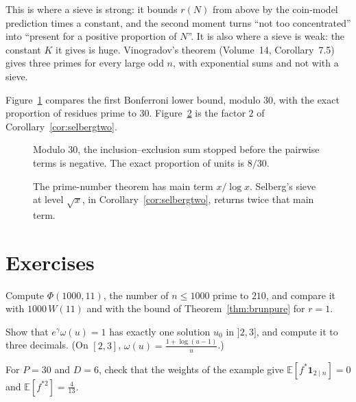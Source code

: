 This is where a sieve is strong: it bounds $r(N)$ from above by the coin-model prediction times a constant, and the second moment turns ``not too concentrated'' into ``present for a positive proportion of $N$''. It is also where a sieve is weak: the constant $K$ it gives is huge. Vinogradov's theorem (Volume~14, Corollary~7.5) gives three primes for every large odd $n$, with exponential sums and not with a sieve.


Figure~\ref{fig:v15c06-bonferroni} compares the first Bonferroni lower bound, modulo \(30\), with the exact proportion of residues prime to \(30\). Figure~\ref{fig:v15c06-factor} is the factor \(2\) of Corollary~\ref{cor:selbergtwo}.

\begin{figure}[ht]
\centering
{}
\caption{Modulo \(30\), the inclusion--exclusion sum stopped before the pairwise terms is negative. The exact proportion of units is \(8/30\).}
\label{fig:v15c06-bonferroni}
\end{figure}

\begin{figure}[ht]
\centering
{}
\caption{The prime-number theorem has main term \(x/\log x\). Selberg's sieve at level \(\sqrt x\), in Corollary~\ref{cor:selbergtwo}, returns twice that main term.}
\label{fig:v15c06-factor}
\end{figure}

\section{Exercises}

\begin{exercise}[$\star$]\label{ex:brunsmall}
Compute $\Phi(1000,11)$, the number of $n\le1000$ prime to $210$, and compare it with $1000\,W(11)$ and with the bound of Theorem~\ref{thm:brunpure} for $r=1$.
\end{exercise}

\begin{exercise}[$\star$]\label{ex:buchstabcross}
Show that $e^\gamma\omega(u)=1$ has exactly one solution $u_0$ in $]2,3]$, and compute it to three decimals. (On $[2,3]$, $\omega(u)=\frac{1+\log(u-1)}u$.)
\end{exercise}

\begin{exercise}[$\star$]\label{ex:weights30}
For $P=30$ and $D=6$, check that the weights of the example give $\mathbb E[f^*\mathbf 1_{2\mid n}]=0$ and $\mathbb E[f^{*2}]=\frac4{13}$.
\end{exercise}

